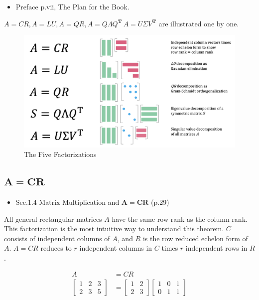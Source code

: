 \documentclass[letterpaper]{article}
\begin{document}
\begin{itemize}
  \item Preface p.vii, The Plan for the Book.
\end{itemize}
$A=CR, A=LU, A=QR, A=Q \Lambda Q^\mathbf{T}\, A=U \Sigma V^\mathbf{T}$ are 
illustrated one by one.

\begin{figure}[H]
  \includegraphics[keepaspectratio, width=\linewidth]{5-Factorizations.png}
  \caption{The Five Factorizations}
\end{figure}

\clearpage

\subsection{$\boldsymbol{A=CR}$}

\begin{itemize}
  \item Sec.1.4 Matrix Multiplication and $\bm{A=CR}$ (p.29)
\end{itemize}

All general rectangular matrices $A$ have the same row rank as the column rank.
This factorization is the most intuitive way to understand this theorem.
$C$ consists of independent columns of $A$, and $R$ is the row reduced echelon form of $A$.
$A=CR$ reduces to $r$ independent columns in $C$ times $r$ independent rows in $R$.

\begin{equation*}
  \begin{split}
    A &= CR\\
  \begin{bmatrix}
    1 & 2 & 3 \\
    2 & 3 & 5
  \end{bmatrix}
  & =
  \begin{bmatrix}
    1 & 2 \\
    2 & 3
  \end{bmatrix}
  \begin{bmatrix}
    1 & 0 & 1 \\
    0 & 1 & 1
  \end{bmatrix}
\end{split}
\end{equation*}
\end{document}
